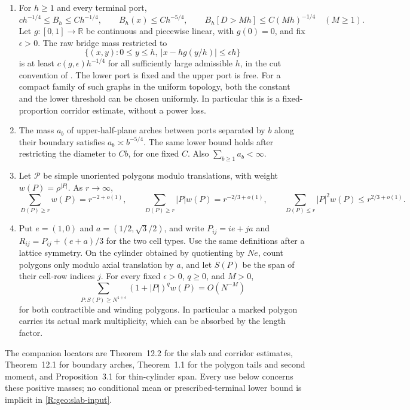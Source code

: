 \begin{enumerate}
\item For $h\ge1$ and every terminal port,
\begin{equation}\label{R:geo:slab-input}
 c h^{-1/4}\le B_h\le C h^{-1/4},\qquad
 B_h(x)\le C h^{-5/4},\qquad
 B_h[D>Mh]\le C(Mh)^{-1/4}\quad(M\ge1).
\end{equation}
Let $g:[0,1]\to\mathbb R$ be continuous and piecewise linear, with
$g(0)=0$, and fix $\epsilon>0$. The raw bridge mass restricted to
\[
 \{(x,y):0\le y\le h,\ |x-hg(y/h)|\le\epsilon h\}
\]
is at least $c(g,\epsilon)h^{-1/4}$ for all sufficiently large
admissible $h$, in the cut convention of \cite[Theorem~12.2]{companionA}.
The lower port is fixed and the upper port is free. For a compact family
of such graphs in the uniform topology, both the constant and the lower
threshold can be chosen uniformly. In particular this is a
fixed-proportion corridor estimate, without a power loss.
\item The mass $a_b$ of upper-half-plane arches between ports separated
by $b$ along their boundary satisfies $a_b\asymp b^{-5/4}$.  The same
lower bound holds after restricting the diameter to $C b$, for one fixed
$C$.  Also $\sum_{b\ge1}a_b<\infty$.
\item Let $\mathcal P$ be simple unoriented polygons modulo translations,
with weight $w(P)=\rho^{|P|}$.  As $r\to\infty$,
\begin{equation}\label{R:geo:polygon-input}
 \sum_{D(P)\ge r}w(P)=r^{-2+o(1)},\qquad
 \sum_{D(P)\ge r}|P|w(P)=r^{-2/3+o(1)},\qquad
 \sum_{D(P)\le r}|P|^2w(P)\le r^{2/3+o(1)}.
\end{equation}
\item Put $e=(1,0)$ and $a=(1/2,\sqrt3/2)$, and write
$P_{ij}=ie+ja$ and $R_{ij}=P_{ij}+(e+a)/3$ for the two cell types.
Use the same definitions after a lattice symmetry. On the cylinder
obtained by quotienting by $Ne$, count polygons only modulo axial
translation by $a$, and let $S(P)$ be the span of their cell-row indices
$j$. For every fixed $\epsilon>0$, $q\ge0$, and $M>0$,
\begin{equation}\label{R:geo:cylinder-input}
 \sum_{P:S(P)\ge N^{1+\epsilon}}(1+|P|)^q w(P)=O(N^{-M})
\end{equation}
for both contractible and winding polygons. In particular a marked
polygon carries its actual mark multiplicity, which can be absorbed by
the length factor.
\end{enumerate}
The companion locators are Theorem~12.2 for the slab and corridor
estimates, Theorem~12.1 for boundary arches, Theorem~1.1 for the polygon
tails and second moment, and Proposition~3.1 for thin-cylinder span.  Every use below concerns these positive
masses; no conditional mean or prescribed-terminal lower bound is
implicit in \eqref{R:geo:slab-input}.

